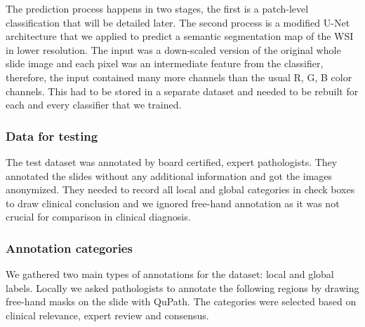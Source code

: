 \documentclass[a4paper,12pt]{article}
\begin{document}
\vspace{7mm}

\par The prediction process happens in two stages, the first is a patch-level classification that will be detailed later. The second process is a modified U-Net \cite{ronneberger2015u} architecture that we applied to predict a semantic segmentation map of the WSI in lower resolution. The input was a down-scaled version of the original whole slide image and each pixel was an intermediate feature from the classifier, therefore, the input contained many more channels than the usual R, G, B color channels. This had to be stored in a separate dataset and needed to be rebuilt for each and every classifier that we trained.

\vspace{4mm}

\subsubsection{Data for testing}

\vspace{4mm}

\par The test dataset was annotated by board certified, expert pathologists. They annotated the slides without any additional information and got the images anonymized. They needed to record all local and global categories in check boxes to draw clinical conclusion and we ignored free-hand annotation as it was not crucial for comparison in clinical diagnosis. 

\vspace{4mm}

\subsubsection{Annotation categories}

\vspace{4mm}

\par We gathered two main types of annotations for the dataset: local and global labels. Locally we asked pathologists to annotate the following regions by drawing free-hand masks on the slide with QuPath. The categories were selected based on clinical relevance, expert review and consensus.

\vspace{4mm}
\end{document}
